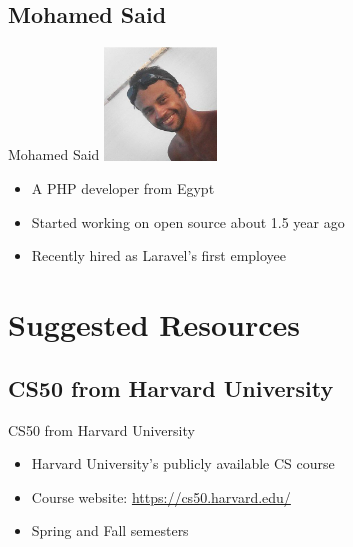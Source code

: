 \documentclass{beamer}
\newcommand{\wl}[2]{\href{#1}{\textcolor{UniBlue}{#2}}}
\begin{document}
\subsection{Mohamed Said}
\begin{frame}{Mohamed Said}
	\centering
	\includegraphics[width=3cm]{images/said.jpg}

	\begin{itemize}
		\item A PHP developer from Egypt
		\item Started working on open source about 1.5 year ago
		\item Recently hired as Laravel's first employee
	\end{itemize}
\end{frame}

\section{Suggested Resources}
\subsection{CS50 from Harvard University}
\begin{frame}{CS50 from Harvard University}
	\begin{itemize}
		\item Harvard University's publicly available CS course
		\item Course website: \wl{https://cs50.harvard.edu/}{https://cs50.harvard.edu/}
		\item Spring and Fall semesters
	\end{itemize}
\end{frame}
\end{document}
